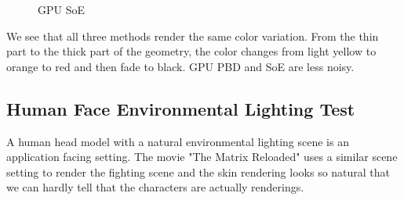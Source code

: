 \documentclass[letterpaper,12pt]{article}
\begin{document}
\begin{figure}[H]
    \centering
    \caption{GPU SoE}%
    \label{}%
\end{figure}

We see that all three methods render the same color variation. From the thin part to the thick part of the geometry, the color changes from light yellow to orange to red and then fade to black. GPU PBD and SoE are less noisy.

\subsection{Human Face Environmental Lighting Test}

A human head model with a natural environmental lighting scene is an application facing setting. The movie "The Matrix Reloaded" uses a similar scene setting to render the fighting scene and the skin rendering looks so natural that we can hardly tell that the characters are actually renderings\cite{borshukov2005realistic}.
\end{document}
